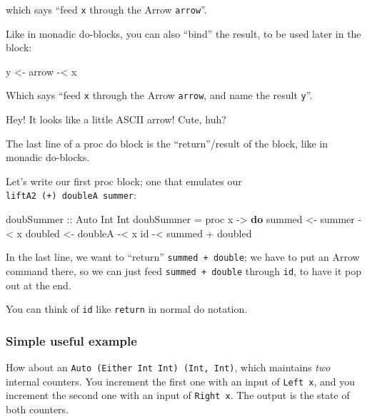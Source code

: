 \documentclass[]{article}
\newenvironment{Shaded}{}{}
\newcommand{\KeywordTok}[1]{\textcolor[rgb]{0.00,0.44,0.13}{\textbf{{#1}}}}
\newcommand{\DataTypeTok}[1]{\textcolor[rgb]{0.56,0.13,0.00}{{#1}}}
\newcommand{\OtherTok}[1]{\textcolor[rgb]{0.00,0.44,0.13}{{#1}}}
\newcommand{\FunctionTok}[1]{\textcolor[rgb]{0.02,0.16,0.49}{{#1}}}
\newcommand{\NormalTok}[1]{{#1}}
\begin{document}
which says ``feed \texttt{x} through the Arrow \texttt{arrow}''.

Like in monadic do-blocks, you can also ``bind'' the result, to be used
later in the block:

\begin{Shaded}
\begin{Highlighting}[]
\NormalTok{y }\OtherTok{<-} \NormalTok{arrow }\FunctionTok{-<} \NormalTok{x}
\end{Highlighting}
\end{Shaded}

Which says ``feed \texttt{x} through the Arrow \texttt{arrow}, and name
the result \texttt{y}''.

Hey! It looks like a little ASCII arrow! Cute, huh?

The last line of a proc do block is the ``return''/result of the block,
like in monadic do-blocks.

Let's write our first proc block; one that emulates our
\texttt{liftA2\ (+)\ doubleA\ summer}:

\begin{Shaded}
\begin{Highlighting}[]
\OtherTok{doubSummer ::} \DataTypeTok{Auto} \DataTypeTok{Int} \DataTypeTok{Int}
\NormalTok{doubSummer }\FunctionTok{=} \NormalTok{proc x }\OtherTok{->} \KeywordTok{do}
    \NormalTok{summed  }\OtherTok{<-} \NormalTok{summer  }\FunctionTok{-<} \NormalTok{x}
    \NormalTok{doubled }\OtherTok{<-} \NormalTok{doubleA }\FunctionTok{-<} \NormalTok{x}
    \NormalTok{id }\FunctionTok{-<} \NormalTok{summed }\FunctionTok{+} \NormalTok{doubled}
\end{Highlighting}
\end{Shaded}

In the last line, we want to ``return'' \texttt{summed\ +\ double}; we
have to put an Arrow command there, so we can just feed
\texttt{summed\ +\ double} through \texttt{id}, to have it pop out at
the end.

You can think of \texttt{id} like \texttt{return} in normal do notation.

\subsubsection{Simple useful example}\label{simple-useful-example}

How about an \texttt{Auto\ (Either\ Int\ Int)\ (Int,\ Int)}, which
maintains \emph{two} internal counters. You increment the first one with
an input of \texttt{Left\ x}, and you increment the second one with an
input of \texttt{Right\ x}. The output is the state of both counters.
\end{document}
